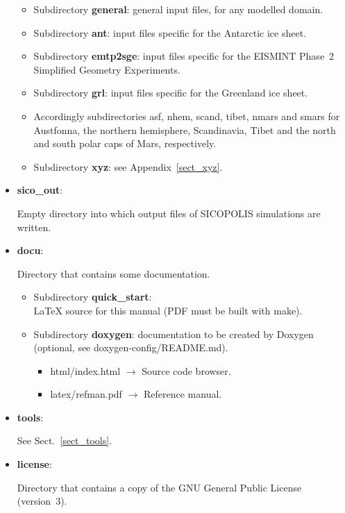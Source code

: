 \documentclass[12pt,a4paper]{article}
\begin{document}
\begin{itemize}
\begin{itemize}
\item
Subdirectory \textbf{general}: general input files, for any modelled domain.

\item
Subdirectory \textbf{ant}: input files specific for the Antarctic ice sheet.

\item
Subdirectory \textbf{emtp2sge}: input files specific for the EISMINT Phase~2 Simplified Geometry Experiments.

\item
Subdirectory \textbf{grl}: input files specific for the Greenland ice sheet.

\item
Accordingly subdirectories asf, nhem, scand, tibet, nmars and smars for Austfonna, the northern hemisphere, Scandinavia, Tibet and the north and south polar caps of Mars, respectively.

\item
Subdirectory \textbf{xyz}: see Appendix~\ref{sect_xyz}.

\end{itemize}

\item \textbf{sico\_out}:

Empty directory into which output files of SICOPOLIS simulations are written.

\item \textbf{docu}:

Directory that contains some documentation.

\begin{itemize}

\item
Subdirectory \textbf{quick\_start}:\\
\LaTeX{} source for this manual (PDF must be built with make).

\item
Subdirectory \textbf{doxygen}: documentation to be created by Doxygen\\
(optional, see doxygen-config/README.md).

\begin{itemize}

\item html/index.html $\longrightarrow$ Source code browser.

\item latex/refman.pdf $\longrightarrow$ Reference manual.

\end{itemize}

\end{itemize}

\item \textbf{tools}:

See Sect.~\ref{sect_tools}.

\item \textbf{license}:

Directory that contains a copy of the GNU General Public License (version~3).

\end{itemize}
\end{document}
